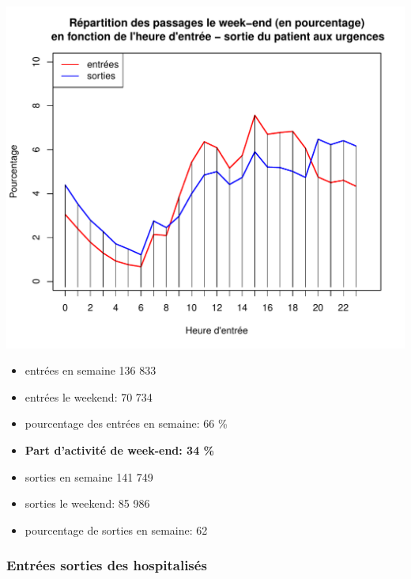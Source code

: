 \documentclass[12pt,english,french,twoside]{book}\usepackage[]{graphicx}\usepackage[]{color}
\makeatletter
\def\maxwidth{ %
  \ifdim\Gin@nat@width>\linewidth
    \linewidth
  \else
    \Gin@nat@width
  \fi
}
\newenvironment{knitrout}{}{} %
\makeatother
\begin{document}
\begin{center}
\begin{knitrout}
\color{fgcolor}
\includegraphics[width=\maxwidth]{figure/graphe2_es_we} 

\end{knitrout}

\label{fig:graphe2_es_we} %
\end{center}

\begin{boxedminipage}{10cm}
\begin{itemize}
  \item entrées en semaine 136 833
  \item entrées le weekend: 70 734
  \item pourcentage des entrées en semaine: 66 \%
  \item \textbf{Part d'activité de week-end: 34 \%}
  \item sorties en semaine 141 749
  \item sorties le weekend: 85 986
  \item pourcentage de sorties en semaine: 62
\end{itemize}
\end{boxedminipage}

\subsubsection*{Entrées sorties des hospitalisés}
\end{document}
